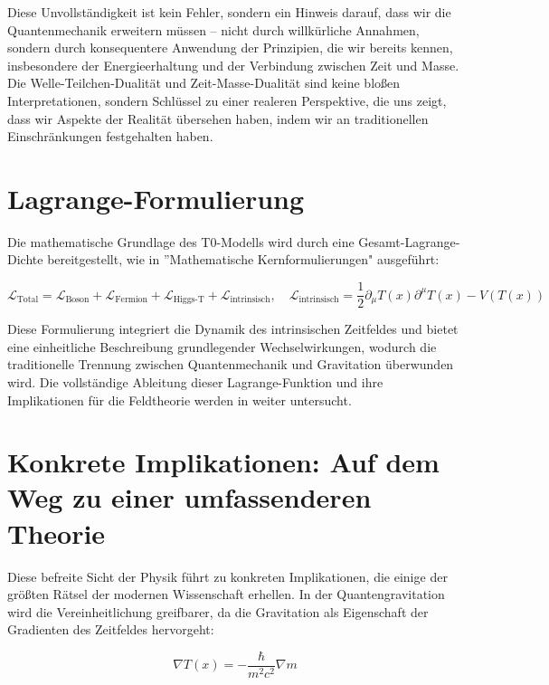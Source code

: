 \documentclass[a4paper,12pt]{article}
\newcommand{\Tfield}{T(x)}
\begin{document}
	Diese Unvollständigkeit ist kein Fehler, sondern ein Hinweis darauf, dass wir die Quantenmechanik erweitern müssen – nicht durch willkürliche Annahmen, sondern durch konsequentere Anwendung der Prinzipien, die wir bereits kennen, insbesondere der Energieerhaltung und der Verbindung zwischen Zeit und Masse. Die Welle-Teilchen-Dualität und Zeit-Masse-Dualität sind keine bloßen Interpretationen, sondern Schlüssel zu einer realeren Perspektive, die uns zeigt, dass wir Aspekte der Realität übersehen haben, indem wir an traditionellen Einschränkungen festgehalten haben.
	
	\section{Lagrange-Formulierung}
	
	Die mathematische Grundlage des T0-Modells wird durch eine Gesamt-Lagrange-Dichte bereitgestellt, wie in ''Mathematische Kernformulierungen" \cite{pascher_lagrange_2025} ausgeführt:
	
	\begin{equation}
		\mathcal{L}_{\text{Total}} = \mathcal{L}_{\text{Boson}} + \mathcal{L}_{\text{Fermion}} + \mathcal{L}_{\text{Higgs-T}} + \mathcal{L}_{\text{intrinsisch}}, \quad \mathcal{L}_{\text{intrinsisch}} = \frac{1}{2} \partial_\mu \Tfield \partial^\mu \Tfield - V(\Tfield)
	\end{equation}
	
	Diese Formulierung integriert die Dynamik des intrinsischen Zeitfeldes und bietet eine einheitliche Beschreibung grundlegender Wechselwirkungen, wodurch die traditionelle Trennung zwischen Quantenmechanik und Gravitation überwunden wird. Die vollständige Ableitung dieser Lagrange-Funktion und ihre Implikationen für die Feldtheorie werden in \cite{pascher_feldtheorie_2025} weiter untersucht.
	
	\section{Konkrete Implikationen: Auf dem Weg zu einer umfassenderen Theorie}
	
	Diese befreite Sicht der Physik führt zu konkreten Implikationen, die einige der größten Rätsel der modernen Wissenschaft erhellen. In der Quantengravitation wird die Vereinheitlichung greifbarer, da die Gravitation als Eigenschaft der Gradienten des Zeitfeldes hervorgeht:
	
	\begin{equation}
		\nabla \Tfield = -\frac{\hbar}{m^2 c^2} \nabla m
	\end{equation}
	
\end{document}
